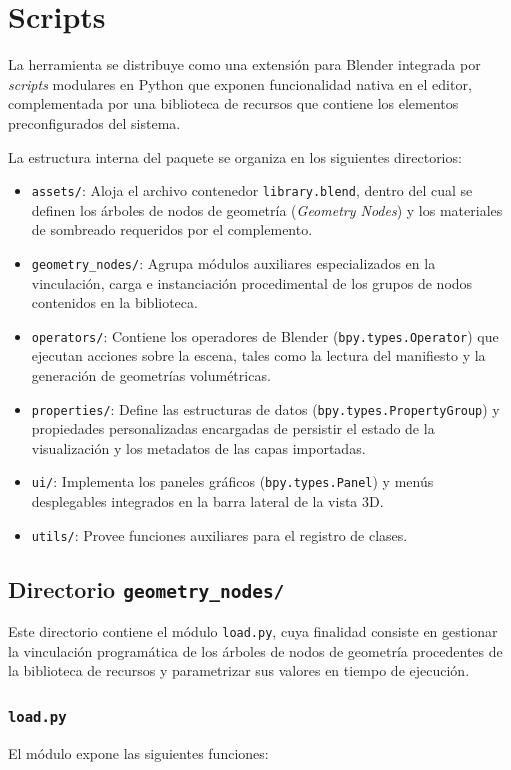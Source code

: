 \section{Scripts}
La herramienta se distribuye como una extensión para Blender integrada por \textit{scripts} modulares en Python que exponen funcionalidad 
nativa en el editor, complementada por una biblioteca de recursos que contiene los elementos preconfigurados del sistema.

La estructura interna del paquete se organiza en los siguientes directorios:
\begin{itemize}
    \item \texttt{assets/}: Aloja el archivo contenedor \texttt{library.blend}, dentro del cual se definen los árboles de nodos de geometría 
    (\textit{Geometry Nodes}) y los materiales de sombreado requeridos por el complemento.
    \item \texttt{geometry\_nodes/}: Agrupa módulos auxiliares especializados en la vinculación, carga e instanciación procedimental de los 
    grupos de nodos contenidos en la biblioteca.
    \item \texttt{operators/}: Contiene los operadores de Blender (\texttt{bpy.types.Operator}) que ejecutan acciones sobre la escena, tales 
    como la lectura del manifiesto y la generación de geometrías volumétricas.
    \item \texttt{properties/}: Define las estructuras de datos (\texttt{bpy.types.PropertyGroup}) y propiedades personalizadas encargadas 
    de persistir el estado de la visualización y los metadatos de las capas importadas.
    \item \texttt{ui/}: Implementa los paneles gráficos (\texttt{bpy.types.Panel}) y menús desplegables integrados en la barra lateral de 
    la vista 3D.
    \item \texttt{utils/}: Provee funciones auxiliares para el registro de clases.
\end{itemize}

\subsection{Directorio \texttt{geometry\_nodes/}}
Este directorio contiene el módulo \texttt{load.py}, cuya finalidad consiste en gestionar la vinculación programática de los árboles de 
nodos de geometría procedentes de la biblioteca de recursos y parametrizar sus valores en tiempo de ejecución.

\subsubsection{\texttt{load.py}}
El módulo expone las siguientes funciones:

